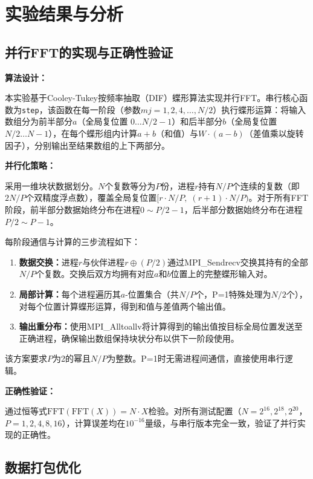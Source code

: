 \documentclass{SYSUReport}
\begin{document}
\section{实验结果与分析}

\subsection{并行FFT的实现与正确性验证}

\textbf{算法设计：}

本实验基于Cooley-Tukey按频率抽取（DIF）蝶形算法实现并行FFT。串行核心函数为\texttt{step}，该函数在每一阶段（参数$mj = 1, 2, 4, \dots, N/2$）执行蝶形运算：将输入数组分为前半部分$a$（全局复位置 $0 \dots N/2-1$）和后半部分$b$（全局复位置 $N/2 \dots N-1$），在每个蝶形组内计算$a+b$（和值）与$W \cdot (a-b)$（差值乘以旋转因子），分别输出至结果数组的上下两部分。

\textbf{并行化策略：}

采用一维块状数据划分。$N$个复数等分为$P$份，进程$r$持有$N/P$个连续的复数（即$2N/P$个双精度浮点数），覆盖全局复位置$[r \cdot N/P,\; (r+1) \cdot N/P)$。对于所有FFT阶段，前半部分数据始终分布在进程$0 \sim P/2-1$，后半部分数据始终分布在进程$P/2 \sim P-1$。

每阶段通信与计算的三步流程如下：
\begin{enumerate}
    \item \textbf{数据交换：}进程$r$与伙伴进程$r \oplus (P/2)$通过MPI\_Sendrecv交换其持有的全部$N/P$个复数。交换后双方均拥有对应$a$和$b$位置上的完整蝶形输入对。
    \item \textbf{局部计算：}每个进程遍历其$a$-位置集合（共$N/P$个，P=1特殊处理为$N/2$个），对每个位置计算蝶形运算，得到和值与差值两个输出值。
    \item \textbf{输出重分布：}使用MPI\_Alltoallv将计算得到的输出值按目标全局位置发送至正确进程，确保输出数组保持块状分布以供下一阶段使用。
\end{enumerate}

该方案要求$P$为2的幂且$N/P$为整数。P=1时无需进程间通信，直接使用串行逻辑。

\textbf{正确性验证：}

通过恒等式$\text{FFT}(\text{FFT}(X)) = N \cdot X$检验。对所有测试配置（$N=2^{16}, 2^{18}, 2^{20}$，$P=1,2,4,8,16$），计算误差均在$10^{-16}$量级，与串行版本完全一致，验证了并行实现的正确性。

\subsection{数据打包优化}
\end{document}

